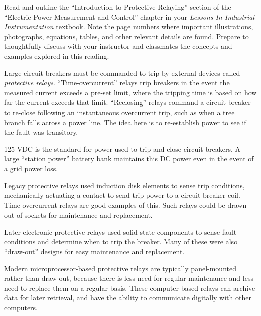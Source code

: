 

Read and outline the ``Introduction to Protective Relaying'' section of the ``Electric Power Measurement and Control'' chapter in your {\it Lessons In Industrial Instrumentation} textbook.  Note the page numbers where important illustrations, photographs, equations, tables, and other relevant details are found.  Prepare to thoughtfully discuss with your instructor and classmates the concepts and examples explored in this reading.













Large circuit breakers must be commanded to trip by external devices called {\it protective relays}.  ``Time-overcurrent'' relays trip breakers in the event the measured current exceeds a pre-set limit, where the tripping time is based on how far the current exceeds that limit.  ``Reclosing'' relays command a circuit breaker to re-close following an instantaneous overcurrent trip, such as when a tree branch falls across a power line.  The idea here is to re-establish power to see if the fault was transitory.

\vskip 10pt

125 VDC is the standard for power used to trip and close circuit breakers.  A large ``station power'' battery bank maintains this DC power even in the event of a grid power loss.

\vskip 10pt

Legacy protective relays used induction disk elements to sense trip conditions, mechanically actuating a contact to send trip power to a circuit breaker coil.  Time-overcurrent relays are good examples of this.  Such relays could be drawn out of sockets for maintenance and replacement.

Later electronic protective relays used solid-state components to sense fault conditions and determine when to trip the breaker.  Many of these were also ``draw-out'' designs for easy maintenance and replacement.

Modern microprocessor-based protective relays are typically panel-mounted rather than draw-out, because there is less need for regular maintenance and less need to replace them on a regular basis.  These computer-based relays can archive data for later retrieval, and have the ability to communicate digitally with other computers.

